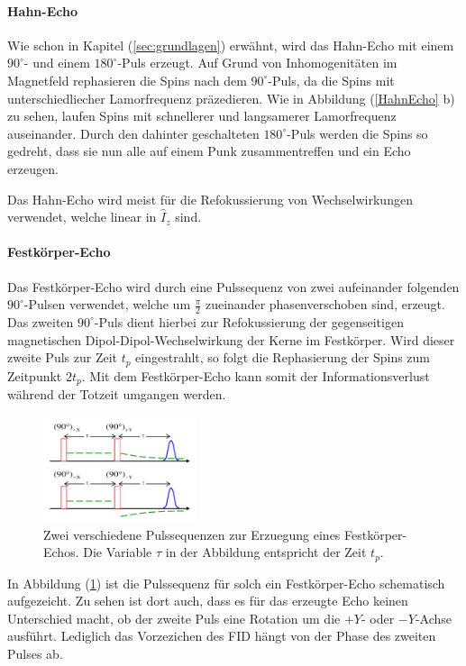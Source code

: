 \paragraph{Hahn-Echo}
Wie schon in Kapitel (\ref{sec:grundlagen}) erw\"{a}hnt, wird das Hahn-Echo mit einem $90^{\circ}$- und einem $180^{\circ}$-Puls erzeugt.
Auf Grund von Inhomogenit\"{a}ten im Magnetfeld rephasieren die Spins nach dem $90^{\circ}$-Puls, da die Spins mit unterschiedliecher Lamorfrequenz pr\"{a}zedieren.
Wie in Abbildung (\ref{HahnEcho} b) zu sehen, laufen Spins mit schnellerer und langsamerer Lamor{\-}fre{\-}quenz auseinander.
Durch den dahinter geschalteten $180^{\circ}$-Puls werden die Spins so gedreht, dass sie nun alle auf einem Punk zusammentreffen und ein Echo erzeugen.

Das Hahn-Echo wird meist f\"{u}r die Refokussierung von Wechselwirkungen verwendet, welche linear in $\widehat{I}_z$ sind.

\paragraph{Festk\"{o}rper-Echo}
Das Festk\"{o}rper-Echo wird durch eine Pulssequenz von zwei aufeinan{\-}der folgenden $90^{\circ}$-Pulsen verwendet, welche um $\frac{\pi}{2}$ zueinander phasenverschoben sind, erzeugt.
Das zweiten $90^{\circ}$-Puls dient hierbei zur Refokussierung der gegenseitigen magne{\-}tisch{\-}en Dipol-Dipol-Wechselwirkung der Kerne im Festkörper.
Wird dieser zweite Puls zur Zeit $t_p$ eingestrahlt, so folgt die Rephasierung der Spins zum Zeitpunkt $2 t_p$.
Mit dem Festk\"{o}rper-Echo kann somit der Informationsverlust w\"{a}hrend der Totzeit umgangen werden.
\begin{figure}
\centering
	\includegraphics[width=0.4\textwidth]{Plots/festkoerperecho2.png}
	\caption{Zwei verschiedene Pulssequenzen zur Erzuegung eines Festk\"{o}rper-Echos. Die Variable $\tau$ in der Abbildung entspricht der Zeit $t_p$.}
	\label{FK_echo.}
\end{figure}
In Abbildung (\ref{FK_echo.}) ist die Pulssequenz f\"{u}r solch ein Festk\"{o}rper-Echo schematisch aufgezeicht.
Zu sehen ist dort auch, dass es f\"{u}r das erzeugte Echo keinen Unterschied macht, ob der zweite Puls eine Rotation um die $+Y$- oder $-Y$-Achse ausf\"{u}hrt.
Lediglich das Vorzezichen des FID h\"{a}ngt von der Phase des zweiten Pulses ab.

